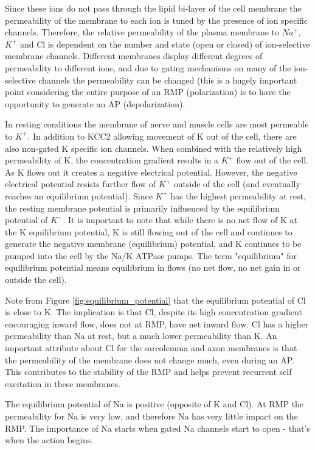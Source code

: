 Since these ions do not pass through the lipid bi-layer of the cell membrane the permeability of the membrane to each ion is tuned by the presence of ion specific channels. Therefore, the relative permeability of the plasma membrane to $Na^+$, $K^+$ and Cl is dependent on the number and state (open or closed) of ion-selective membrane channels. Different membranes display different degrees of permeability to different ions, and due to gating mechanisms on many of the ion-selective channels the permeability can be changed (this is a hugely important point considering the entire purpose of an RMP (polarization) is to have the opportunity to generate an AP (depolarization).

In resting conditions the membrane of nerve and muscle cells are most permeable to $K^+$. In addition to KCC2 allowing movement of K out of the cell, there are also non-gated K specific ion channels. When combined with the relatively high permeability of K, the concentration gradient results in a $K^+$ flow out of the cell. As K flows out it creates a negative electrical potential. However, the negative electrical potential resists further flow of $K^+$ outside of the cell (and eventually reaches an equilibrium potential). Since $K^+$ has the highest permeability at rest, the resting membrane potential is primarily influenced by the equilibrium potential of $K^+$. It is important to note that while there is no net flow of K at the K equilibrium potential, K is still flowing out of the cell and continues to generate the negative membrane (equilibrium) potential, and K continues to be pumped into the cell by the Na/K ATPase pumps. The term "equilibrium" for equilibrium potential means equilibrium in flows (no net flow, no net gain in or outside the cell).

Note from Figure \ref{fig:equilibrium_potential} that the equilibrium potential of Cl is close to K. The implication is that Cl, despite its high concentration gradient encouraging inward flow, does not at RMP, have net inward flow. Cl has a higher permeability than Na at rest, but a much lower permeability than K. An important attribute about Cl for the sarcolemma and axon membranes is that the permeability of the membrane does not change much, even during an AP. This contributes to the stability of the RMP and helps prevent recurrent self excitation in these membranes.

The equilibrium potential of Na is positive (opposite of K and Cl). At RMP the permeability for Na is very low, and therefore Na has very little impact on the RMP. The importance of Na starts when gated Na channels start to open - that's when the action begins.

